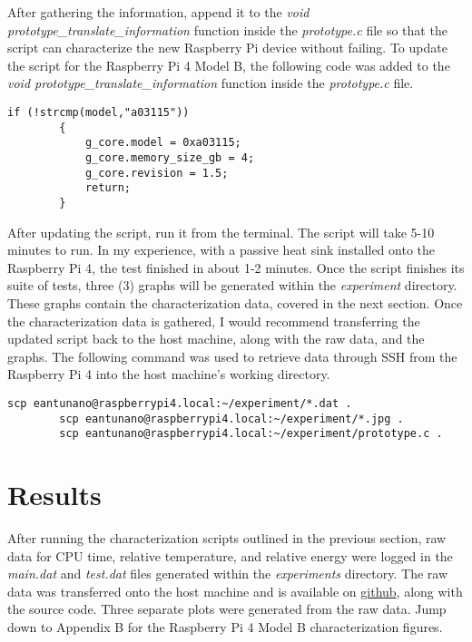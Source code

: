 \documentclass[journal]{IEEEtran}
\begin{document}
    After gathering the information, append it to the \emph{void prototype\_translate\_information} function inside the \emph{prototype.c} file so that the script can characterize the new Raspberry Pi device without failing.
    To update the script for the Raspberry Pi 4 Model B, the following code was added to the \emph{void prototype\_translate\_information} function inside the \emph{prototype.c} file. 

    \begin{lstlisting}[frame=single]
        if (!strcmp(model,"a03115"))
        {
            g_core.model = 0xa03115;
            g_core.memory_size_gb = 4;
            g_core.revision = 1.5;
            return;
        } 
    \end{lstlisting}

    After updating the script, run it from the terminal. 
    The script will take 5-10 minutes to run. In my experience, with a passive heat sink installed onto the Raspberry Pi 4, the test finished in about 1-2 minutes.
    Once the script finishes its suite of tests, three (3) graphs will be generated within the \emph{experiment} directory.
    These graphs contain the characterization data, covered in the next section.
    Once the characterization data is gathered, I would recommend transferring the updated script back to the host machine, along with the raw data, and the graphs.
    The following command was used to retrieve data through SSH from the Raspberry Pi 4 into the host machine's working directory.

    \begin{lstlisting}[frame=single]
        scp eantunano@raspberrypi4.local:~/experiment/*.dat .
        scp eantunano@raspberrypi4.local:~/experiment/*.jpg .
        scp eantunano@raspberrypi4.local:~/experiment/prototype.c .
    \end{lstlisting}

    \section{Results}
    After running the characterization scripts outlined in the previous section, raw data for CPU time, relative temperature, and relative energy were logged in the \emph{main.dat} and \emph{test.dat} files generated within the \emph{experiments} directory.
    The raw data was transferred onto the host machine and is available on {\href{https://github.com/enriquea02/uw/tree/d529ec8c53c7cc006b5184ab091cdea1d053dabc/eep522a_embedded_and_real-time_systems/submissions/a1_configuration}{github}}, along with the source code.
    Three separate plots were generated from the raw data. Jump down to Appendix B for the Raspberry Pi 4 Model B characterization figures.
    
\end{document}
